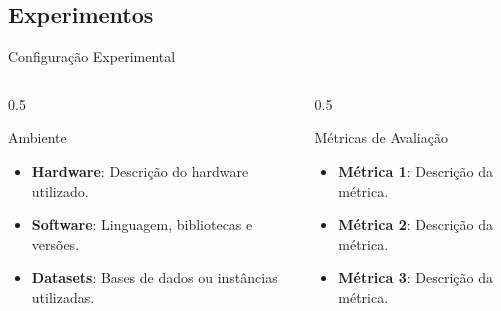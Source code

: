 \subsection{Experimentos}
\begin{frame}{Configuração Experimental}
  \begin{columns}[t]
    \begin{column}{0.5\textwidth}
      \begin{block}{Ambiente}
        \begin{itemize}
          \scriptsize
          \item \textbf{Hardware}: Descrição do hardware utilizado.
          \item \textbf{Software}: Linguagem, bibliotecas e versões.
          \item \textbf{Datasets}: Bases de dados ou instâncias utilizadas.
        \end{itemize}
      \end{block}
    \end{column}
    \begin{column}{0.5\textwidth}
      \begin{block}{Métricas de Avaliação}
        \begin{itemize}
          \scriptsize
          \item \textbf{Métrica 1}: Descrição da métrica.
          \item \textbf{Métrica 2}: Descrição da métrica.
          \item \textbf{Métrica 3}: Descrição da métrica.
        \end{itemize}
      \end{block}
    \end{column}
  \end{columns}
\end{frame}

